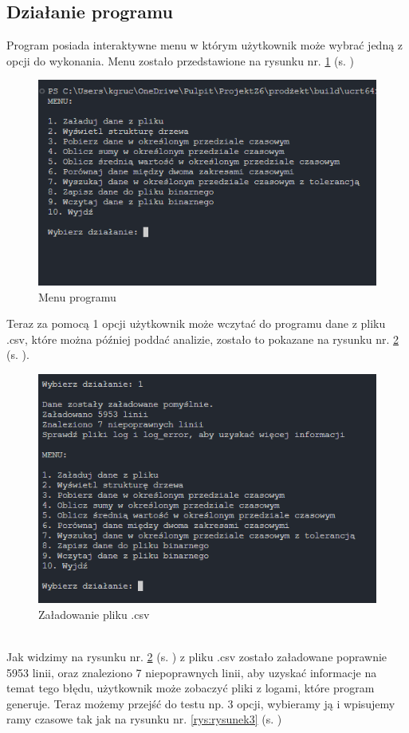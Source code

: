 \subsection{Działanie programu}
Program posiada interaktywne menu w którym użytkownik może wybrać jedną z opcji do wykonania. Menu zostało przedstawione na rysunku nr. \ref{rys:rysunek1} (s. \pageref{rys:rysunek1}) 
\begin{figure}[h]
    \centering
    \includegraphics[width=0.8\linewidth]{img/1.png}
    \caption{Menu programu}
    \label{rys:rysunek1}
\end{figure}
\newpage
\noindent Teraz za pomocą 1 opcji użytkownik może wczytać do programu dane z pliku .csv, które można później poddać analizie, zostało to pokazane na rysunku nr. \ref{rys:rysunek2} (s. \pageref{rys:rysunek2}).
\\
\begin{figure}[h]
    \centering
    \includegraphics[width=0.8\linewidth]{img/2.png}
    \caption{Załadowanie pliku .csv}
    \label{rys:rysunek2}
\end{figure} \\
Jak widzimy na rysunku nr. \ref{rys:rysunek2} (s. \pageref{rys:rysunek2}) z pliku .csv zostało załadowane poprawnie 5953 linii, oraz znaleziono 7 niepoprawnych linii, aby uzyskać informacje na temat tego błędu, użytkownik może zobaczyć pliki z logami, które program generuje. Teraz możemy przejść do testu np. 3 opcji, wybieramy ją i wpisujemy ramy czasowe tak jak na rysunku nr. \ref{rys:rysunek3} (s. \pageref{rys:rysunek3})
